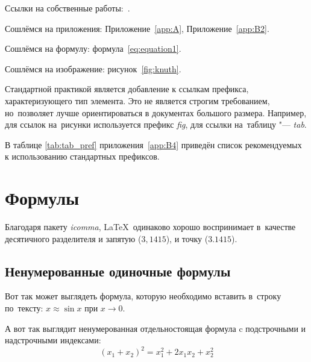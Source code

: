 %

Ссылки на собственные работы:~\cite{vakbib1, confbib1}.

Сошлёмся на приложения: Приложение~\cref{app:A}, Приложение~\cref{app:B2}.

Сошлёмся на формулу: формула~\cref{eq:equation1}.

Сошлёмся на изображение: рисунок~\cref{fig:knuth}.

Стандартной практикой является добавление к ссылкам префикса, характеризующего тип элемента.
Это не является строгим требованием, но~позволяет лучше ориентироваться в документах большого размера.
Например, для ссылок на~рисунки используется префикс \textit{fig},
для ссылки на~таблицу "--- \textit{tab}.

В таблице \cref{tab:tab_pref} приложения~\cref{app:B4} приведён список рекомендуемых
к использованию стандартных префиксов.

\section{Формулы}\label{sec:ch1/sec3}

Благодаря пакету \textit{icomma}, \LaTeX~одинаково хорошо воспринимает
в~качестве десятичного разделителя и запятую (\(3,1415\)), и точку (\(3.1415\)).

\subsection{Ненумерованные одиночные формулы}\label{subsec:ch1/sec3/sub1}

Вот так может выглядеть формула, которую необходимо вставить в~строку
по~тексту: \(x \approx \sin x\) при \(x \to 0\).

А вот так выглядит ненумерованная отдельностоящая формула c подстрочными
и надстрочными индексами:
\[
    (x_1+x_2)^2 = x_1^2 + 2 x_1 x_2 + x_2^2
\]

